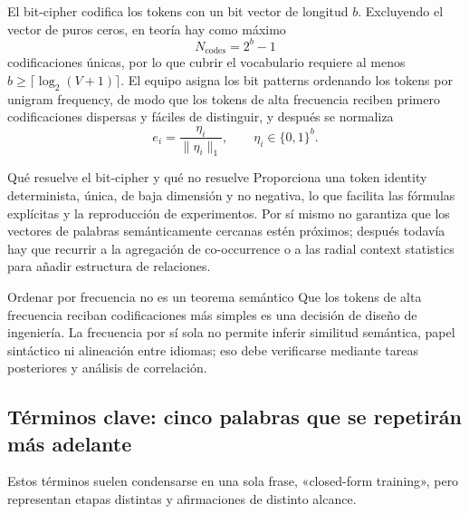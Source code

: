 El bit-cipher codifica los tokens con un bit vector de longitud $b$. Excluyendo el vector de puros ceros, en teoría hay como máximo
\[
N_{\text{codes}}=2^b-1
\]
codificaciones únicas, por lo que cubrir el vocabulario requiere al menos $b\ge \lceil\log_2(V+1)\rceil$. El equipo asigna los bit patterns ordenando los tokens por unigram frequency, de modo que los tokens de alta frecuencia reciben primero codificaciones dispersas y fáciles de distinguir, y después se normaliza
\[
e_i=\frac{\eta_i}{\|\eta_i\|_1},\qquad \eta_i\in\{0,1\}^{b}.
\]


\begin{knowledgebox}{Qué resuelve el bit-cipher y qué no resuelve}
Proporciona una token identity determinista, única, de baja dimensión y no negativa, lo que facilita las fórmulas explícitas y la reproducción de experimentos. Por sí mismo no garantiza que los vectores de palabras semánticamente cercanas estén próximos; después todavía hay que recurrir a la agregación de co-occurrence o a las radial context statistics para añadir estructura de relaciones.
\end{knowledgebox}

\begin{warningbox}{Ordenar por frecuencia no es un teorema semántico}
Que los tokens de alta frecuencia reciban codificaciones más simples es una decisión de diseño de ingeniería. La frecuencia por sí sola no permite inferir similitud semántica, papel sintáctico ni alineación entre idiomas; eso debe verificarse mediante tareas posteriores y análisis de correlación.
\end{warningbox}


\subsection{Términos clave: cinco palabras que se repetirán más adelante}

Estos términos suelen condensarse en una sola frase, «closed-form training», pero representan etapas distintas y afirmaciones de distinto alcance.

